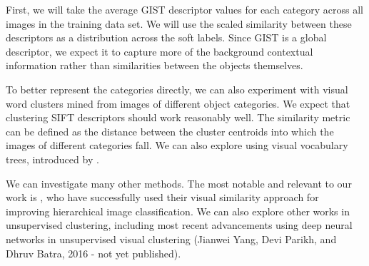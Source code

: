 First, we will take the average GIST descriptor \cite{oliva2001modeling} values
for each category across all images in the training data set. We will use the
scaled similarity between these descriptors as a distribution across the soft
labels.
Since GIST is a global descriptor, we expect it to capture more of the
background contextual information rather than similarities between the objects
themselves.

To better represent the categories directly, we can also experiment with
visual word clusters mined from images of different object categories.
We expect that clustering SIFT descriptors \cite{lowe1999object} should work
reasonably well.
The similarity metric can be defined as the distance between the cluster
centroids into which the images of different categories fall.
We can also explore using visual vocabulary trees, introduced by
\cite{nister2006scalable}.

We can investigate many other methods. The most notable and relevant to our
work is \cite{li2010building}, who have successfully used their visual
similarity approach for improving hierarchical image classification.
We can also explore other works in unsupervised clustering, including most
recent advancements using deep neural networks in unsupervised visual
clustering
(Jianwei Yang, Devi Parikh, and Dhruv Batra, 2016 - not yet published).

